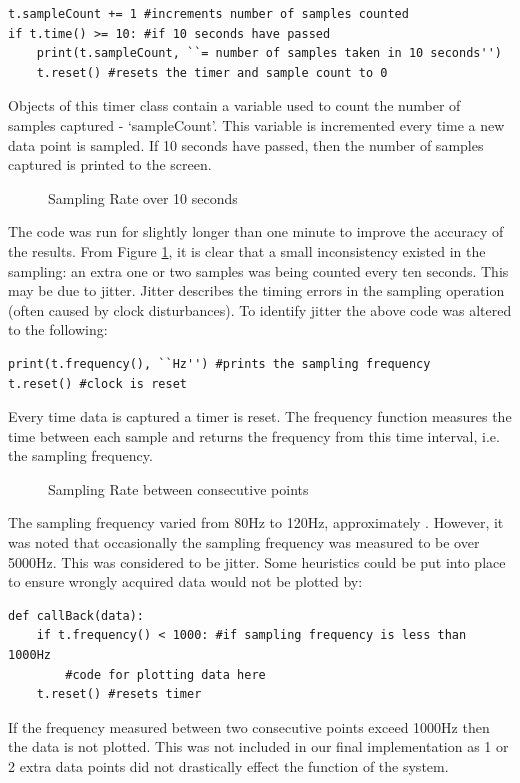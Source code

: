 \documentclass{article}
\begin{document}
\lstset{language=Python}
\begin{lstlisting}
t.sampleCount += 1 #increments number of samples counted
if t.time() >= 10: #if 10 seconds have passed
    print(t.sampleCount, ``= number of samples taken in 10 seconds'')
    t.reset() #resets the timer and sample count to 0
\end{lstlisting}
Objects of this timer class contain a variable used to count the number of samples captured - `sampleCount'. This variable is incremented every time a new data point is sampled. If 10 seconds have passed, then the number of samples captured is printed to the screen.
\newline
\begin{figure}[H]
    \centering
    
    \caption{Sampling Rate over 10 seconds}
    \label{fig:tenSecs}
\end{figure}
\newline 
The code was run for slightly longer than one minute to improve the accuracy of the results. From Figure \ref{fig:tenSecs}, it is clear that a small inconsistency existed in the sampling: an extra one or two samples was being counted every ten seconds. This may be due to jitter. Jitter describes the timing errors in the sampling operation (often caused by clock disturbances). To identify jitter the above code was altered to the following:
\lstset{language=Python}
\begin{lstlisting}
print(t.frequency(), ``Hz'') #prints the sampling frequency
t.reset() #clock is reset
\end{lstlisting}
Every time data is captured a timer is reset. The frequency function measures the time between each sample and returns the frequency from this time interval, i.e. the sampling frequency.
\newline
\begin{figure}[H]
    \centering
    
    \caption{Sampling Rate between consecutive points}
    \label{fig:sampleF}
\end{figure}
\newline 
The sampling frequency varied from 80Hz to 120Hz, approximately . However, it was noted that occasionally the sampling frequency was measured to be over 5000Hz. This was considered to be jitter. Some heuristics could be put into place to ensure wrongly acquired data would not be plotted by:
\lstset{language=Python}
\begin{lstlisting}
def callBack(data):
    if t.frequency() < 1000: #if sampling frequency is less than 1000Hz
        #code for plotting data here
    t.reset() #resets timer
\end{lstlisting}
If the frequency measured between two consecutive points exceed 1000Hz then the data is not plotted. This was not included in our final implementation as 1 or 2 extra data points did not drastically effect the function of the system.
\end{document}
